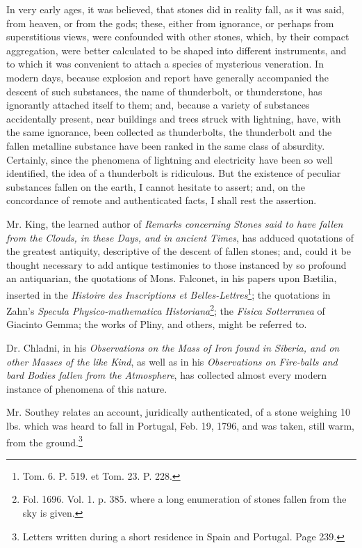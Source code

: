 \documentclass[a4paper, 12pt, oneside]{article}
\begin{document}
In very early ages, it was believed, that stones did in reality fall, as it was said, from heaven, or from the gods; these, either from ignorance, or perhaps from superstitious views, were confounded with other stones, which, by their compact aggregation, were better calculated to be shaped into different instruments, and to which it was convenient to attach a species of mysterious veneration. In modern days, because explosion and report have generally accompanied the descent of such substances, the name of thunderbolt, or thunderstone, has ignorantly attached itself to them; and, because a variety of substances accidentally present, near buildings and trees struck with lightning, have, with the same ignorance, been collected as thunderbolts, the thunderbolt and the fallen metalline substance have been ranked in the same class of absurdity. Certainly, since the phenomena of lightning and electricity have been so well identified, the idea of a thunderbolt is ridiculous. But the existence of peculiar substances fallen on the earth, I cannot hesitate to assert; and, on the concordance of remote and authenticated facts, I shall rest the assertion.

Mr. King, the learned author of \emph{Remarks concerning Stones said to have fallen from the Clouds, in these Days, and in ancient Times}, has adduced quotations of the greatest antiquity, descriptive of the descent of fallen stones; and, could it be thought necessary to add antique testimonies to those instanced by so profound an antiquarian, the quotations of Mons. Falconet, in his papers upon Bætilia, inserted in the \emph{Histoire des Inscriptions et Belles-Lettres}\footnote{Tom. 6. P. 519. et Tom. 23. P. 228.}; the quotations in Zahn's \emph{Specula Physico-mathematica Historiana}\footnote{Fol. 1696. Vol. 1. p. 385. where a long enumeration of stones fallen from the sky is given.}; the \emph{Fisica Sotterranea} of Giacinto Gemma; the works of Pliny, and others, might be referred to.

Dr. Chladni, in his \emph{Observations on the Mass of Iron found in Siberia, and on other Masses of the like Kind}, as well as in his \emph{Observations on Fire-balls and bard Bodies fallen from the Atmosphere}, has collected almost every modern instance of phenomena of this nature.

Mr. Southey relates an account, juridically authenticated, of a stone weighing 10 lbs. which was heard to fall in Portugal, Feb. 19, 1796, and was taken, still warm, from the ground.\footnote{Letters written during a short residence in Spain and Portugal. Page 239.}
\end{document}
